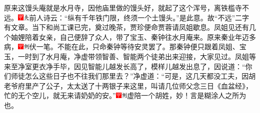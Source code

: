 原来这馒头庵就是水月寺，因他庙里做的馒头好，就起了这个浑号，离铁槛寺不远。{\includegraphics[width=3mm]{../Images/00002}\includegraphics[width=3mm]{../Images/00012}\footnotesize \kaishu 前人诗云：“纵有千年铁门限，终须一个土馒头。”是此意。故“不远”二字有文章。}当下和尚工课已完，奠过晚茶，贾珍便命贾蓉请凤姐歇息。凤姐见还有几个妯娌陪着女亲，自己便辞了众人，带了宝玉、秦钟往水月庵来。原来秦业年迈多病，{\includegraphics[width=3mm]{../Images/00002}\includegraphics[width=3mm]{../Images/00011}\footnotesize \kaishu 伏一笔。}不能在此，只命秦钟等待安灵罢了。那秦钟便只跟着凤姐、宝玉，一时到了水月庵，净虚带领智善、智能两个徒弟出来迎接，大家见过。凤姐等来至净室更衣净手毕，因见智能儿越发长高了，模样儿越发出息了，因说道：“你们师徒怎么这些日子也不往我们那里去？”净虚道：“可是，这几天都没工夫，因胡老爷府里产了公子，太太送了十两银子来这里，叫请几位师父念三日《血盆经》，忙的无个空儿，就无来请奶奶的安。”{\includegraphics[width=3mm]{../Images/00002}\includegraphics[width=3mm]{../Images/00011}\footnotesize \kaishu 虚陪一个胡姓，妙！言是糊涂人之所为也。}

